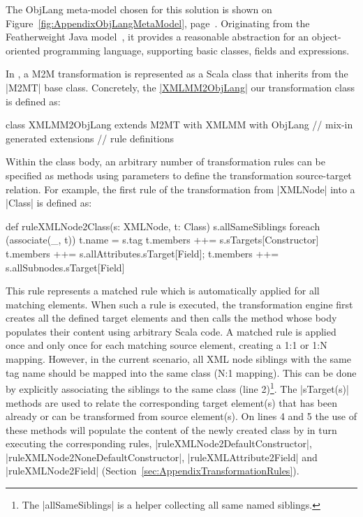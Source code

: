 The ObjLang meta-model chosen for this solution is shown on Figure~\ref{fig:AppendixObjLangMetaModel}, page~\pageref{fig:AppendixObjLangMetaModel}.
Originating from the Featherweight Java model~\cite{Igarashi2001}, it provides a reasonable abstraction for an object-oriented programming language, supporting basic classes, fields and expressions.

In \SIGMA, a M2M transformation is represented as a Scala class that inherits from the \Scala|M2MT| base class.
Concretely, the \href{https://github.com/fikovnik/ttc14-fixml-sigma/blob/master/ttc14-fixml-base/src/fr/inria/spirals/sigma/ttc14/fixml/XMLMM2ObjLang.scala}{\Scala|XMLMM2ObjLang|} our transformation class is defined as:
%
\begin{scalacode}
class XMLMM2ObjLang extends M2MT with XMLMM with ObjLang { // mix-in generated extensions
  // rule definitions 
}  
\end{scalacode}
%
Within the class body, an arbitrary number of transformation rules can be specified as methods using parameters to define the transformation source-target relation.
For example, the first rule of the transformation from \Scala|XMLNode| into a \Scala|Class| is defined as:
%
\begin{scalacode}
def ruleXMLNode2Class(s: XMLNode, t: Class) {
  s.allSameSiblings foreach (associate(_, t))
  t.name = s.tag
  t.members ++= s.sTargets[Constructor]
  t.members ++= s.allAttributes.sTarget[Field]; t.members ++= s.allSubnodes.sTarget[Field]
}
\end{scalacode}
%
This rule represents a matched rule which is automatically applied for all matching elements.
When such a rule is executed, the transformation engine first creates all the defined target elements and then calls the method whose body populates their content using arbitrary Scala code.
A matched rule is applied once and only once for each matching source element, creating a 1:1 or 1:N mapping.
However, in the current scenario, all XML node siblings with the same tag name should be mapped into the same class (N:1 mapping).
This can be done by explicitly associating the siblings to the same class (line 2)\footnote{The \Scala|allSameSiblings| is a helper collecting all same named siblings.}.
%
The \Scala|sTarget(s)| methods are used to relate the corresponding target element(s) that has been already or can be transformed from source element(s).
On lines 4 and 5 the use of these methods will populate the content of the newly created class by in turn executing the corresponding rules, \Ie \Scala|ruleXMLNode2DefaultConstructor|, \Scala|ruleXMLNode2NoneDefaultConstructor|, \Scala|ruleXMLAttribute2Field| and \Scala|ruleXMLNode2Field| (\Cf Section~\ref{sec:AppendixTransformationRules}).

